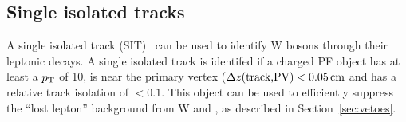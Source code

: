 \subsection{Single isolated tracks\label{recSIT}}

A single isolated track (SIT)~\cite{singleleptonstop} can be used to 
identify W bosons through their leptonic decays. A single isolated track 
is identifed if a charged PF object has at least a $p_{\mathrm{T}}$ of 10\gev, 
is near the primary vertex ($\Delta z (\textrm{track,PV}) <0.05\,\text{cm}$ 
and has a relative track isolation of $<0.1$. This object can be
used to efficiently suppress the ``lost lepton'' background from W and
\ttbar, as described in Section~\ref{sec:vetoes}. 


